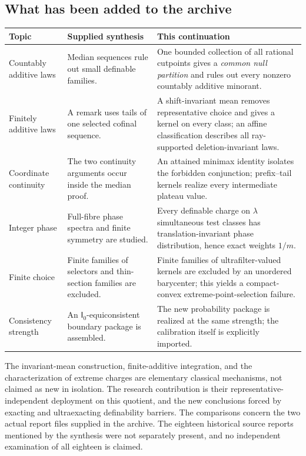 \documentclass[11pt,letterpaper]{article}
\theoremstyle{definition}
\newcommand{\Izero}{\mathsf I_0}
\begin{document}
\subsection{What has been added to the archive}

\begin{center}
\small
\renewcommand{\arraystretch}{1.16}
\begin{tabularx}{\textwidth}{@{}p{}YY@{}}
\toprule
\textbf{Topic}&\textbf{Supplied synthesis}&\textbf{This continuation}\\
\midrule
Countably additive laws&Median sequences rule out small definable families.&One bounded collection of all rational cutpoints gives a \emph{common null partition} and rules out every nonzero countably additive minorant.\\
Finitely additive laws&A remark uses tails of one selected cofinal sequence.&A shift-invariant mean removes representative choice and gives a kernel on every class; an affine classification describes all ray-supported deletion-invariant laws.\\
Coordinate continuity&The two continuity arguments occur inside the median proof.&An attained minimax identity isolates the forbidden conjunction; prefix--tail kernels realize every intermediate plateau value.\\
Integer phase&Full-fibre phase spectra and finite symmetry are studied.&Every definable charge on $\lambda$ simultaneous test classes has translation-invariant phase distribution, hence exact weights $1/m$.\\
Finite choice&Finite families of selectors and thin-section families are excluded.&Finite families of ultrafilter-valued kernels are excluded by an unordered barycenter; this yields a compact-convex extreme-point-selection failure.\\
Consistency strength&An $\Izero$-equiconsistent boundary package is assembled.&The new probability package is realized at the same strength; the calibration itself is explicitly imported.\\
\bottomrule
\end{tabularx}
\end{center}

The invariant-mean construction, finite-additive integration, and the characterization of extreme charges are elementary classical mechanisms, not claimed as new in isolation. The research contribution is their representative-independent deployment on this quotient, and the new conclusions forced by exacting and ultraexacting definability barriers. The comparisons concern the two actual report files supplied in the archive. The eighteen historical source reports mentioned by the synthesis were not separately present, and no independent examination of all eighteen is claimed.
\end{document}
